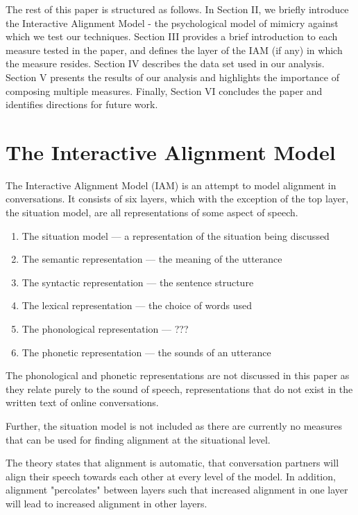 \documentclass[conference]{IEEEtran}
\begin{document}
The rest of this paper is structured as follows. In Section II, we briefly introduce the Interactive Alignment Model - the psychological model of mimicry against which we test our techniques. Section III provides a brief introduction to each measure tested in the paper, and defines the layer of the IAM (if any) in which the measure resides. Section IV describes the data set used in our analysis. Section V presents the results of our analysis and highlights the importance of composing multiple measures. Finally, Section VI concludes the paper and identifies directions for future work.


\section{The Interactive Alignment Model}
The Interactive Alignment Model (IAM) \cite{pickering2004toward} is an attempt to model alignment in
conversations. It consists of six layers, which with the exception of the top layer, the situation
model, are all representations of some aspect of speech.

\begin{enumerate}
	\item The situation model --- a representation of the situation being discussed
	\item The semantic representation --- the meaning of the utterance
	\item The syntactic representation --- the sentence structure
	\item The lexical representation --- the choice of words used
	\item The phonological representation --- ???
	\item The phonetic representation --- the sounds of an utterance
\end{enumerate}

The phonological and phonetic representations are not discussed in this paper as they relate purely
to the sound of speech, representations that do not exist in the written text of online conversations.

Further, the situation model is not included as there are currently no measures that can be used for
finding alignment at the situational level.

The theory states that alignment is automatic, that conversation partners will align their speech 
towards each other at every level of the model. In addition, alignment "percolates" between layers such
that increased alignment in one layer will lead to increased alignment in other layers.
\end{document}

